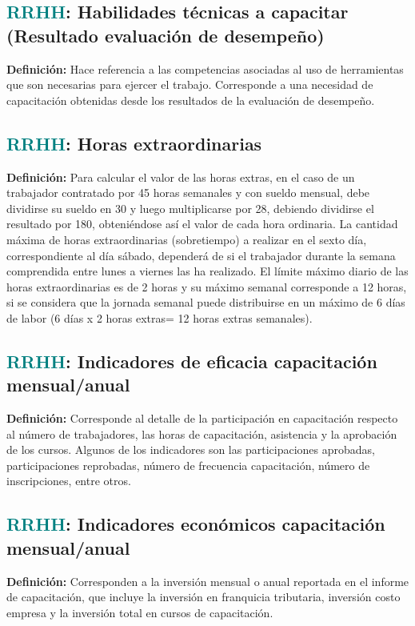 \documentclass[12pt]{article}
\begin{document}
\subsection{\textcolor{teal}{RRHH}: Habilidades técnicas a capacitar (Resultado evaluación de desempeño)}
\textbf{Definición:} Hace referencia a las competencias asociadas al uso de herramientas que son necesarias para ejercer el trabajo. Corresponde a una necesidad de capacitación obtenidas desde los resultados de la evaluación de desempeño.
\subsection{\textcolor{teal}{RRHH}: Horas extraordinarias}
\textbf{Definición:} Para calcular el valor de las horas extras, en el caso de un trabajador contratado por 45 horas semanales y con sueldo mensual, debe dividirse su sueldo en 30 y luego multiplicarse por 28, debiendo dividirse el resultado por 180, obteniéndose así el valor de cada hora ordinaria.
La cantidad máxima de horas extraordinarias (sobretiempo) a realizar en el sexto día, correspondiente al día sábado, dependerá de si el trabajador durante la semana comprendida entre lunes a viernes las ha realizado. El límite máximo diario de las horas extraordinarias es de 2 horas y su máximo semanal corresponde a 12 horas, si se considera que la jornada semanal puede distribuirse en un máximo de 6 días de labor (6 días x 2 horas extras= 12 horas extras semanales). 
\subsection{\textcolor{teal}{RRHH}: Indicadores de eficacia capacitación mensual/anual}
\textbf{Definición:} Corresponde al detalle de la participación en capacitación respecto al número de trabajadores, las horas de capacitación, asistencia y la aprobación de los cursos. Algunos de los indicadores son las participaciones aprobadas, participaciones reprobadas, número de frecuencia capacitación, número de inscripciones, entre otros.
\subsection{\textcolor{teal}{RRHH}: Indicadores económicos capacitación mensual/anual}
\textbf{Definición:} Corresponden a la inversión mensual o anual reportada en el informe de capacitación, que incluye la inversión en franquicia tributaria, inversión costo empresa y la inversión total en cursos de capacitación.
\end{document}
